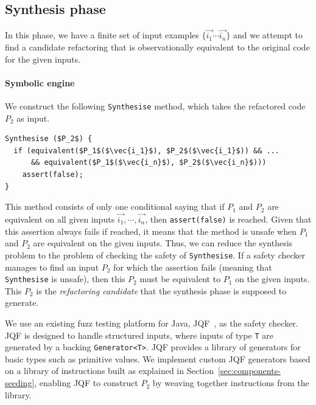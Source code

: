\documentclass[sigconf]{acmart}
\begin{document}

\subsection{Synthesis phase}\label{sec:synthesis}
In this phase, we have
a finite set of input examples $\{\vec{i_1} \cdots \vec{i_n}\}$ and we attempt to find a candidate refactoring
that is observationally equivalent to the original code for the given inputs.

\paragraph{Symbolic engine}
We construct the following \lstinline[breaklines=true]{Synthesise} method, which
takes the refactored code $P_2$ as input.

\begin{lstlisting}[mathescape=true,showstringspaces=false,numbers=none]
Synthesise ($P_2$) {
  if (equivalent($P_1$($\vec{i_1}$), $P_2$($\vec{i_1}$)) && ...
      && equivalent($P_1$($\vec{i_n}$), $P_2$($\vec{i_n}$)))
    assert(false);
}
\end{lstlisting}

This method consists of only one conditional saying that if $P_1$ and $P_2$ are equivalent on all given inputs $\vec{i_1}, \cdots, \vec{i_n}$, then \lstinline[breaklines=true]{assert(false)} is reached.
Given that this assertion always fails if reached, it means that the method is unsafe when $P_1$ and $P_2$ are equivalent on the given inputs.
Thus, we can reduce the synthesis problem to the problem of checking the safety of \lstinline[breaklines=true]{Synthesise}. If a safety checker manages to
find an input $P_2$ for which the assertion fails (meaning that \lstinline[breaklines=true]{Synthesise} is unsafe), then this $P_2$ must be equivalent to $P_1$ on the given inputs. This $P_2$ is the {\em refactoring candidate}
that the synthesis phase is supposed to generate.

We use an existing fuzz testing platform for Java, JQF~\cite{DBLP:conf/issta/PadhyeLS19},
as the safety checker. JQF is designed to handle structured inputs, where inputs of type \lstinline[breaklines=true]{T}
are generated by a backing \lstinline[breaklines=true]{Generator<T>}. JQF provides a library of
generators for basic types such as primitive values. We implement custom
JQF generators based on a library of instructions built as explained in Section~\ref{sec:components-seeding},
enabling JQF to construct $P_2$ by weaving together instructions from the library.
\end{document}
